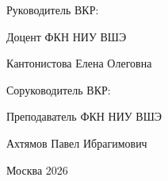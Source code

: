 \begin{titlepage}
\begin{flushright}
\vspace{0.5cm}

{\fontsize{14}{16}\selectfont Руководитель ВКР:\par}
{\fontsize{14}{16}\selectfont Доцент ФКН НИУ ВШЭ\par}
{\fontsize{14}{16}\selectfont Кантонистова Елена Олеговна\par}

\vspace{0.5cm}

{\fontsize{14}{16}\selectfont Соруководитель ВКР:\par}
{\fontsize{14}{16}\selectfont Преподаватель ФКН НИУ ВШЭ\par}
{\fontsize{14}{16}\selectfont Ахтямов Павел Ибрагимович\par}
\end{flushright}

\vfill

\begin{center}
{\fontsize{12}{18}\selectfont Москва 2026\par}
\end{center}

\end{titlepage}

